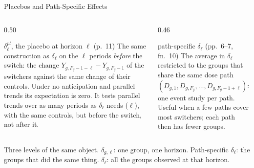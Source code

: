 \documentclass[main.tex]{subfiles}
\begin{document}
\begin{frame}{Placebos and Path-Specific Effects}

  \begin{columns}[T]
    \begin{column}{0.50\textwidth}
      \begin{defbox}{$\delta^{pl}_\ell$, the placebo at horizon $\ell$ (p.~11)}
        \footnotesize
        The same construction as $\delta_\ell$ on the $\ell$ periods
        \emph{before} the switch: the change $Y_{g,F_g-1-\ell} - Y_{g,F_g-1}$
        of the switchers against the same change of their controls. Under no
        anticipation and parallel trends its expectation is zero. It tests
        parallel trends over as many periods as $\delta_\ell$ needs ($\ell$),
        with the same controls, but before the switch, not after it.
      \end{defbox}
    \end{column}
    \begin{column}{0.46\textwidth}
      \begin{defbox}{path-specific $\delta_\ell$ (pp.~6--7, fn.~10)}
        \footnotesize
        The average in $\delta_\ell$ restricted to the groups that share the
        same dose path $(D_{g,1}, D_{g,F_g}, \ldots, D_{g,F_g-1+\ell})$: one
        event study per path. Useful when a few paths cover most switchers;
        each path then has fewer groups.
      \end{defbox}
    \end{column}
  \end{columns}

  \medskip
  \footnotesize Three levels of the same object. $\delta_{g,\ell}$: one group,
  one horizon. Path-specific $\delta_\ell$: the groups that did the same
  thing. $\delta_\ell$: all the groups observed at that horizon.

\end{frame}
\end{document}
